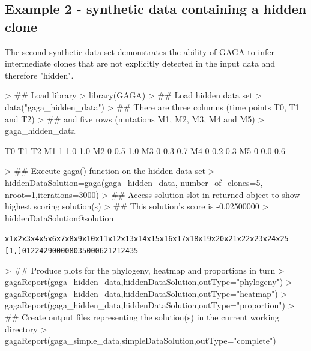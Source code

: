 \documentclass{article}
\begin{document}
\subsection{Example 2 - synthetic data containing a hidden clone}
The second synthetic data set demonstrates the ability of GAGA to infer intermediate clones that are not explicitly detected in the input data and therefore "hidden".

\begin{Schunk}
\begin{Sinput}
> ## Load library
> library(GAGA)
> ## Load hidden data set
> data("gaga_hidden_data")
> ## There  are three columns (time points T0, T1 and T2)
> ## and five rows (mutations M1, M2, M3, M4 and M5)
> gaga_hidden_data
\end{Sinput}
\begin{Soutput}
   T0  T1  T2
M1  1 1.0 1.0
M2  0 0.5 1.0
M3  0 0.3 0.7
M4  0 0.2 0.3
M5  0 0.0 0.6
\end{Soutput}
\end{Schunk}

\begin{Schunk}
\begin{Sinput}
> ## Execute gaga() function on the hidden data set
> hiddenDataSolution=gaga(gaga_hidden_data, number_of_clones=5, nroot=1,iterations=3000)
> ## Access solution slot in returned object to show highest scoring solution(s)
> ## This solution's score is -0.02500000
> hiddenDataSolution@solution
\end{Sinput}
\end{Schunk}
\begin{alltt}
     x1 x2 x3 x4 x5 x6 x7 x8 x9 x10 x11 x12 x13 x14 x15 x16 x17 x18 x19 x20 x21 x22 x23 x24 x25
[1,]  0  1  2  2  4 29  0  0  0   0   8   0   3   5   0   0   0   6   2  12   1   2   4   3   5
\end{alltt}

\begin{Schunk}
\begin{Sinput}
> ## Produce plots for the phylogeny, heatmap and proportions in turn
> gagaReport(gaga_hidden_data,hiddenDataSolution,outType="phylogeny")
> gagaReport(gaga_hidden_data,hiddenDataSolution,outType="heatmap")
> gagaReport(gaga_hidden_data,hiddenDataSolution,outType="proportion")
> ## Create output files representing the solution(s) in the current working directory
> gagaReport(gaga_simple_data,simpleDataSolution,outType="complete")
\end{Sinput}
\end{Schunk}
\end{document}
